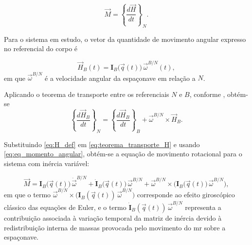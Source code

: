 \begin{equation}
\vec{M}
=
\left\{ \frac{d\vec{H}}{dt} \right\}_{N}.
\label{eq:eq_momento_angular}
\end{equation}

Para o sistema em estudo, o vetor da quantidade de movimento angular expresso no
referencial do corpo é

\begin{equation}
\vec{H}_B(t)
=
\mathbf{I}_B\big(\vec{q}(t)\big)\,
\vec{\omega}^{B/N}(t),
\label{eq:H_def}
\end{equation}
em que $\vec{\omega}^{B/N}$ é a velocidade angular da espaçonave em relação a $N$.

Aplicando o teorema de transporte entre os referenciais $N$ e $B$, conforme \cite{wie2008space}, obtém-se
\begin{equation}
\left\{ \frac{d\vec{H}_B}{dt} \right\}_{N}
=
\left\{ \frac{d\vec{H}_B}{dt} \right\}_{B}
+
\vec{\omega}^{B/N} \times \vec{H}_B.
\label{eq:teorema_transporte_H}
\end{equation}

Substituindo \eqref{eq:H_def} em \eqref{eq:teorema_transporte_H} e usando
\eqref{eq:eq_momento_angular}, obtém-se a equação de movimento rotacional para o sistema
com inércia variável:

\begin{equation}
\vec{M}
=
\mathbf{I}_B\big(\vec{q}(t)\big)\,
\dot{\vec{\omega}}^{B/N}
+
\dot{\mathbf{I}}_B\big(\vec{q}(t)\big)\,
\vec{\omega}^{B/N}
+
\vec{\omega}^{B/N} \times
\Big(
\mathbf{I}_B\big(\vec{q}(t)\big)\,
\vec{\omega}^{B/N}
\Big),
\label{eq:euler_inercia_variavel}
\end{equation}
em que o termo
$\vec{\omega}^{B/N} \times \big(\mathbf{I}_B(\vec{q}(t))\,\vec{\omega}^{B/N}\big)$
corresponde ao efeito giroscópico clássico das equações de Euler, e o termo
$\dot{\mathbf{I}}_B(\vec{q}(t))\,\vec{\omega}^{B/N}$ representa a contribuição
associada à variação temporal da matriz de inércia devido à redistribuição
interna de massas provocada pelo movimento do \gls{mr} sobre a espaçonave.

